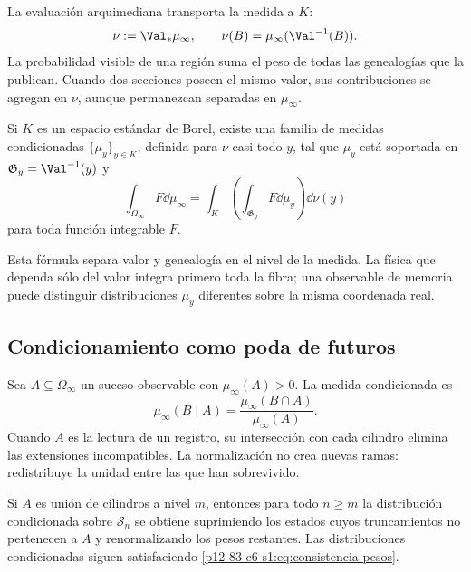 La evaluación arquimediana transporta la medida a \(K\):
\begin{equation}
 \nu:=\Val_*\mu_\infty,
 \qquad
 \nu(B)=\mu_\infty(\Val^{-1}(B)).
 \label{p12-83-c6-s1:eq:pushforward-arquimediano}
\end{equation}
La probabilidad visible de una región suma el peso de todas las genealogías que
la publican. Cuando dos secciones poseen el mismo valor, sus contribuciones se
agregan en \(\nu\), aunque permanezcan separadas en \(\mu_\infty\).

\begin{proposition}
Si \(K\) es un espacio estándar de Borel, existe una familia de medidas
condicionadas \(\{\mu_y\}_{y\in K}\), definida para \(\nu\)-casi todo \(y\),
tal que \(\mu_y\) está soportada en \(\mathfrak G_y=\Val^{-1}(y)\) y
\[
 \int_{\Omega_\infty}F\dd\mu_\infty
 =\int_K\left(\int_{\mathfrak G_y}F\dd\mu_y\right)\dd\nu(y)
\]
para toda función integrable \(F\).
\end{proposition}

Esta fórmula separa valor y genealogía en el nivel de la medida. La física que
dependa sólo del valor integra primero toda la fibra; una observable de memoria
puede distinguir distribuciones \(\mu_y\) diferentes sobre la misma
coordenada real.

\subsection{Condicionamiento como poda de futuros}

Sea \(A\subseteq\Omega_\infty\) un suceso observable con
\(\mu_\infty(A)>0\). La medida condicionada es
\begin{equation}
 \mu_\infty(B\mid A)
 =\frac{\mu_\infty(B\cap A)}{\mu_\infty(A)}.
 \label{p12-83-c6-s1:eq:condicionamiento-genealogico}
\end{equation}
Cuando \(A\) es la lectura de un registro, su intersección con cada cilindro
elimina las extensiones incompatibles. La normalización no crea nuevas ramas:
redistribuye la unidad entre las que han sobrevivido.

\begin{proposition}
Si \(A\) es unión de cilindros a nivel \(m\), entonces para todo \(n\ge m\)
la distribución condicionada sobre \(\mathcal S_n\) se obtiene suprimiendo los
estados cuyos truncamientos no pertenecen a \(A\) y renormalizando los pesos
restantes. Las distribuciones condicionadas siguen satisfaciendo
\eqref{p12-83-c6-s1:eq:consistencia-pesos}.
\end{proposition}

